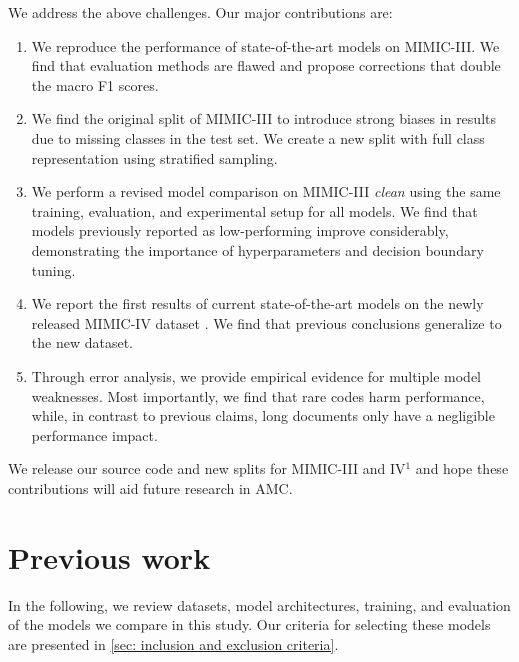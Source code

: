 {We address the above challenges. Our major contributions are:
\begin{enumerate}
    \item We reproduce the performance of state-of-the-art models on MIMIC-III. We find that evaluation methods are flawed and propose corrections that double the macro F1 scores.
    \item We find the original split of MIMIC-III to introduce strong biases in results due to missing classes in the test set. We create a new split with full class representation using stratified sampling.
    \item We perform a revised model comparison on MIMIC-III \textit{clean} using the same training, evaluation, and experimental setup for all models. We find that models previously reported as low-performing improve considerably, demonstrating the importance of hyperparameters and decision boundary tuning.
    \item We report the first results of current state-of-the-art models on the newly released MIMIC-IV dataset \parencite{johnsonMIMICIVFreelyAccessible2023, goldbergerPhysioBankPhysioToolkitPhysioNet2000}. We find that previous conclusions generalize to the new dataset.
    \item Through error analysis, we provide empirical evidence for multiple model weaknesses. Most importantly, we find that rare codes harm performance, while, in contrast to previous claims, long documents only have a negligible performance impact.
\end{enumerate}
We release our source code and new splits for MIMIC-III and IV$^\text{1}$
and hope these contributions will aid future research in AMC.


\section{Previous work}

In the following, we review datasets, model architectures, training, and evaluation of the models we compare in this study. Our criteria for selecting these models are presented in \cref{sec: inclusion and exclusion criteria}.

}
